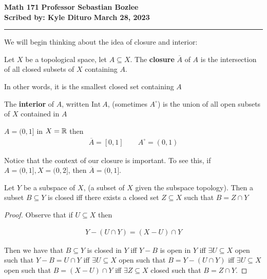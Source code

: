 \documentclass[12pt, twosided]{article}
\begin{document}
\noindent \textbf{Math 171} \hfill \textbf{Professor Sebastian Bozlee} \\
\textbf{Scribed by: Kyle Dituro} \hfill \textbf{March 28, 2023}\hrule
\vspace{.2in}

We will begin thinking about the idea of closure and interior:

\begin{df}
  Let \(X\) be a topological space, let \(A \subseteq X\). The \textbf{closure} \(\overline{A}\) of \(A\) is the intersection of all closed subsets of \(X\) containing \(A\).

  In other words, it is the smallest closed set containing \(A\)
\end{df}

\begin{df}
  The \textbf{interior} of \(A\), written \(\mathrm{Int}\ A\), (sometimes \(A^\circ\)) is the union of all open subsets of \(X\) contained in \(A\)
\end{df}

\begin{exa}
  \(A = (0, 1]\) in \(X = \mathbb{R}\) then
  \begin{align*}
    \overline{A} = [0, 1]\quad\quad A^\circ = (0, 1)
  \end{align*}

  Notice that the context of our closure is important. To see this, if \(A = (0, 1], X = (0, 2]\), then \(\overline{A} = (0, 1]\).
\end{exa}

\begin{lm}
  Let \(Y\) be a subspace of \(X\), (a subset of \(X\) given the subspace topology). Then a subset \(B \subseteq Y\) is closed iff there exists a closed set \(Z \subseteq X\) such that \(B = Z \cap Y\)
\end{lm}
\begin{proof}
  Observe that if \(U \subseteq X\) then

  \begin{align*}
    Y - (U \cap Y) = (X - U) \cap Y
  \end{align*}

  Then we have that \(B \subseteq Y\) is closed in \(Y\) iff \(Y - B\) is open in \(Y\) iff \(\exists U \subseteq X\) open such that \(Y -B = U \cap Y\) iff \(\exists U \subseteq X\) open such that \(B = Y - (U \cap Y)\) iff \(\exists U \subseteq X\) open such that \(B = (X -U) \cap Y\) iff \(\exists Z \subseteq X\) closed such that \(B = Z \cap Y\).
\end{proof}
\end{document}
